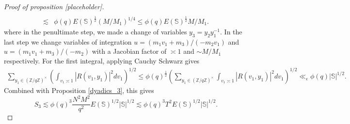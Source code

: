 \begin{proof}[{Proof of proposition [placeholder]}]
\begin{align*}
       \\ \lesssim&
       \phi(q)E(\mathbb{S})^{\frac{1}{2}}(M/M_1)^{1/4}\leq\phi(q)E(\mathbb{S})^{\frac{1}{2}}M/M_1.
       \end{align*}
       where in the penultimate step, we made a change of variables $y_3=y_2y_1^{-1}$. In the last step we change variables of integration $u=(m_1v_1+m_3)/(-m_2v_1)$ and $u=(m_1v_1+m_3)/(-m_2)$ with a Jacobian factor of $\asymp 1$ and $\sim M/M_1$ respectively. 
       For the first integral, applying Cauchy Schwarz gives \begin{align*}
        \sum_{y_1\in (\mathbb{Z}/q\mathbb{Z})^\times} \left(\int_{v_1\asymp 1} 
        \left|R\left(v_1,y_1\right)\right|^2dv_1\right)^{1/2} 
        \leq  \phi(q)^{\frac{1}{2}}\left(\sum_{y_1\in (\mathbb{Z}/q\mathbb{Z})^\times} \int_{v_1\asymp 1} 
        \left|R\left(v_1,y_1\right)\right|^2dv_1\right)^{1/2} 
        \ll_{\epsilon}\phi(q) |\mathbb{S}|^{1/2}.
       \end{align*}
       Combined with Proposition \ref{dyadics_3}, this gives \[
       S_3 \lesssim \phi(q)^3\frac{N^2M^2}{q^2} E(\mathbb{S})^{1/2} |\mathbb{S}|^{1/2} \lesssim  \phi(q)^3 T^2 E(\mathbb{S})^{1/2} |\mathbb{S}|^{1/2}.
       \]
\end{proof}

